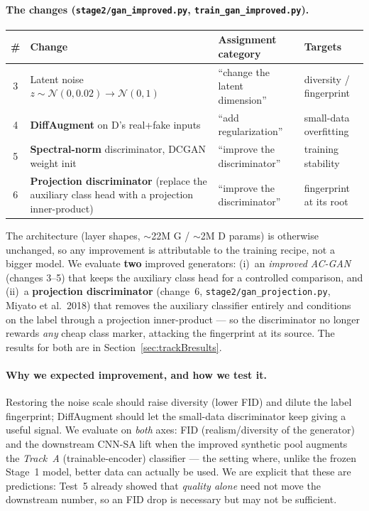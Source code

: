 \documentclass[11pt]{article}
\newcommand{\code}[1]{\texttt{#1}}
\begin{document}
\paragraph{The changes (\code{stage2/gan\_improved.py}, \code{train\_gan\_improved.py}).}
\begin{table}[htbp]
\centering\small
\begin{tabular}{@{}clp{3.4cm}l@{}}
\toprule
\# & \textbf{Change} & \textbf{Assignment category} & \textbf{Targets} \\
\midrule
3 & Latent noise $z\sim\mathcal{N}(0,0.02)\to\mathcal{N}(0,1)$ & ``change the latent dimension'' & diversity / fingerprint \\
4 & \textbf{DiffAugment} on D's real+fake inputs & ``add regularization'' & small-data overfitting \\
5 & \textbf{Spectral-norm} discriminator, DCGAN weight init & ``improve the discriminator'' & training stability \\
6 & \textbf{Projection discriminator} (replace the auxiliary class head with a projection inner-product) & ``improve the discriminator'' & fingerprint at its root \\
\bottomrule
\end{tabular}
\end{table}

The architecture (layer shapes, $\sim$22M G / $\sim$2M D params) is otherwise
unchanged, so any improvement is attributable to the training recipe, not a bigger
model. We evaluate \textbf{two} improved generators: (i)~an \emph{improved AC-GAN}
(changes 3--5) that keeps the auxiliary class head for a controlled comparison, and
(ii)~a \textbf{projection discriminator} (change~6, \code{stage2/gan\_projection.py},
Miyato et al.\ 2018) that removes the auxiliary classifier entirely and conditions on
the label through a projection inner-product --- so the discriminator no longer
rewards \emph{any} cheap class marker, attacking the fingerprint at its source. The
results for both are in Section~\ref{sec:trackBresults}.

\paragraph{Why we expected improvement, and how we test it.} Restoring the noise
scale should raise diversity (lower FID) and dilute the label fingerprint;
DiffAugment should let the small-data discriminator keep giving a useful signal.
We evaluate on \emph{both} axes: FID (realism/diversity of the generator) and the
downstream CNN-SA lift when the improved synthetic pool augments the \emph{Track~A}
(trainable-encoder) classifier --- the setting where, unlike the frozen Stage~1
model, better data can actually be used. We are explicit that these are
predictions: Test~5 already showed that \emph{quality alone} need not move the
downstream number, so an FID drop is necessary but may not be sufficient.
\end{document}
